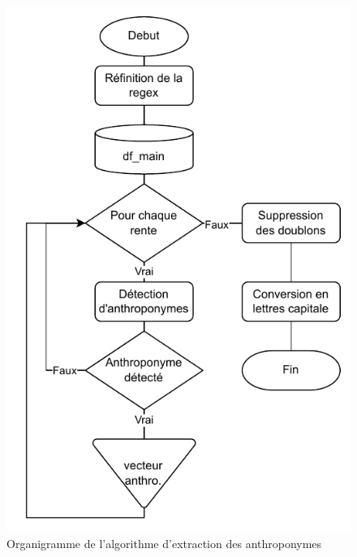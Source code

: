 \begin{figure} %
    \centering
    \includegraphics{2.Methods/Img/REN.drawio.pdf} 
    \caption{Organigramme de l'algorithme d'extraction des anthroponymes}
    \label{schemaRen}
\end{figure}

